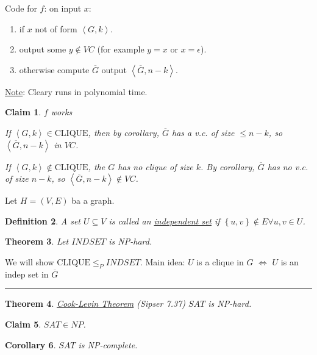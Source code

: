\documentclass[twoside]{article}
\newcounter{lecnum}
\newtheorem{theorem}{Theorem}[lecnum]
\newtheorem{claim}[theorem]{Claim}
\newtheorem{corollary}[theorem]{Corollary}
\newtheorem{definition}[theorem]{Definition}
\newenvironment{proof}{{\bf Proof:}}{\hfill\rule{2mm}{2mm}}
\newcommand{\set}[1]{\left \{ #1 \right \}}
\newcommand{\encoding}[1]{\left \langle #1 \right \rangle}
\newcommand{\Clique}{\text{CLIQUE}}
\begin{document}
Code for $f$: on input $x$:

\begin{enumerate}
  \item if $x$ not of form $\encoding{G, k}$.
  \item output some $y \notin VC$ (for example $y = x$ or $x = \epsilon$).
  \item otherwise compute $\overline{G}$ output $\encoding{\overline{G}, n-k}$.
\end{enumerate}

\underline{Note}: Cleary runs in polynomial time.

\begin{claim}
  $f$ works
  
  If $\encoding{G, k} \in \Clique$, then by corollary, $\overline{G}$ has a v.c. of size $\leq n-k$, so $\encoding{\overline{G}, n-k}$ in $VC$.
  
  If $\encoding{G, k} \notin \Clique$, the $G$ has no clique of size $k$. By corollary, $\overline{G}$ has no v.c. of size $n-k$, so $\encoding{\overline{G}, n-k} \notin VC$.
\end{claim}

Let $H = (V, E)$ ba a graph.

\begin{definition}
  A set $U \subseteq V$ is called an \underline{independent set} if $\set{u, v} \notin E \forall u, v \in U$.
\end{definition}

\begin{theorem}
  Let $INDSET$ is NP-hard.
\end{theorem}

\begin{proof}
  We will show $\Clique \leq_{P} INDSET$. Main idea: $U$ is a clique in $G$ $\Leftrightarrow$ $U$ is an indep set in $\overline{G}$
  
\end{proof}

\begin{theorem}
  \underline{Cook-Levin Theorem} (Sipser 7.37) $SAT$ is NP-hard.
\end{theorem}

\begin{claim}
  $SAT \in NP$.
\end{claim}

\begin{corollary}
  $SAT$ is NP-complete.
\end{corollary}
\end{document}
